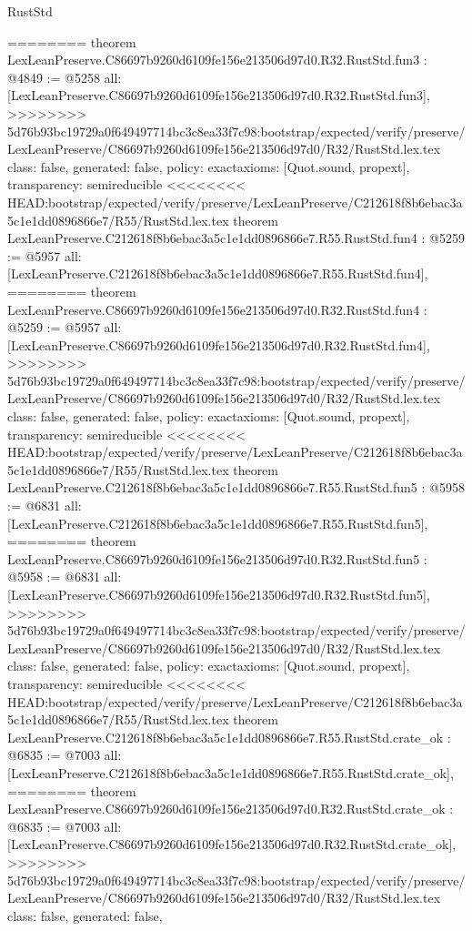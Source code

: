 \begin{lexlean}{RustStd}
\begin{coremodule}
{\begin{coremodule}
{{{{{{========
theorem LexLeanPreserve.C86697b9260d6109fe156e213506d97d0.R32.RustStd.fun3 : @4849 := @5258 {
  all: [LexLeanPreserve.C86697b9260d6109fe156e213506d97d0.R32.RustStd.fun3],
>>>>>>>> 5d76b93bc19729a0f649497714bc3c8ea33f7c98:bootstrap/expected/verify/preserve/LexLeanPreserve/C86697b9260d6109fe156e213506d97d0/R32/RustStd.lex.tex
  class: false,
  generated: false,
  policy: exact{axioms: [Quot.sound, propext]},
  transparency: semireducible
}
<<<<<<<< HEAD:bootstrap/expected/verify/preserve/LexLeanPreserve/C212618f8b6ebac3a5c1e1dd0896866e7/R55/RustStd.lex.tex
theorem LexLeanPreserve.C212618f8b6ebac3a5c1e1dd0896866e7.R55.RustStd.fun4 : @5259 := @5957 {
  all: [LexLeanPreserve.C212618f8b6ebac3a5c1e1dd0896866e7.R55.RustStd.fun4],
========
theorem LexLeanPreserve.C86697b9260d6109fe156e213506d97d0.R32.RustStd.fun4 : @5259 := @5957 {
  all: [LexLeanPreserve.C86697b9260d6109fe156e213506d97d0.R32.RustStd.fun4],
>>>>>>>> 5d76b93bc19729a0f649497714bc3c8ea33f7c98:bootstrap/expected/verify/preserve/LexLeanPreserve/C86697b9260d6109fe156e213506d97d0/R32/RustStd.lex.tex
  class: false,
  generated: false,
  policy: exact{axioms: [Quot.sound, propext]},
  transparency: semireducible
}
<<<<<<<< HEAD:bootstrap/expected/verify/preserve/LexLeanPreserve/C212618f8b6ebac3a5c1e1dd0896866e7/R55/RustStd.lex.tex
theorem LexLeanPreserve.C212618f8b6ebac3a5c1e1dd0896866e7.R55.RustStd.fun5 : @5958 := @6831 {
  all: [LexLeanPreserve.C212618f8b6ebac3a5c1e1dd0896866e7.R55.RustStd.fun5],
========
theorem LexLeanPreserve.C86697b9260d6109fe156e213506d97d0.R32.RustStd.fun5 : @5958 := @6831 {
  all: [LexLeanPreserve.C86697b9260d6109fe156e213506d97d0.R32.RustStd.fun5],
>>>>>>>> 5d76b93bc19729a0f649497714bc3c8ea33f7c98:bootstrap/expected/verify/preserve/LexLeanPreserve/C86697b9260d6109fe156e213506d97d0/R32/RustStd.lex.tex
  class: false,
  generated: false,
  policy: exact{axioms: [Quot.sound, propext]},
  transparency: semireducible
}
<<<<<<<< HEAD:bootstrap/expected/verify/preserve/LexLeanPreserve/C212618f8b6ebac3a5c1e1dd0896866e7/R55/RustStd.lex.tex
theorem LexLeanPreserve.C212618f8b6ebac3a5c1e1dd0896866e7.R55.RustStd.crate_ok : @6835 := @7003 {
  all: [LexLeanPreserve.C212618f8b6ebac3a5c1e1dd0896866e7.R55.RustStd.crate_ok],
========
theorem LexLeanPreserve.C86697b9260d6109fe156e213506d97d0.R32.RustStd.crate_ok : @6835 := @7003 {
  all: [LexLeanPreserve.C86697b9260d6109fe156e213506d97d0.R32.RustStd.crate_ok],
>>>>>>>> 5d76b93bc19729a0f649497714bc3c8ea33f7c98:bootstrap/expected/verify/preserve/LexLeanPreserve/C86697b9260d6109fe156e213506d97d0/R32/RustStd.lex.tex
  class: false,
  generated: false,
}}}}}}}}}}
\end{coremodule}}
\end{coremodule}
\end{lexlean}
